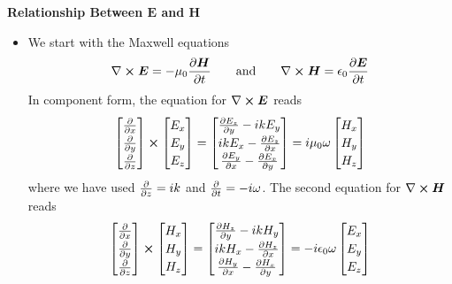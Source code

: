 \documentclass[11pt, a4paper]{article}
\newcommand{\eqtext}[1]{\qquad \text{#1} \qquad}
\renewcommand{\vec}[1]{\bm{#1}} %
\newcommand{\E}{\vec{E}}  %
\renewcommand{\H}{\vec{H}}  %
\newcommand{\ee}{\epsilon_{0}}  %
\newcommand{\mm}{\mu_{0}}  %
\newcommand{\m}{\vec{m}}  %
\renewcommand{\curl}{\nabla \cross}
\begin{document}
\textbf{Relationship Between $ \E $ and $ \H $}
\begin{itemize}
	\item We start with the Maxwell equations
	\begin{equation*}
		\curl \E = - \mm \pdv{\H}{t} \eqtext{and} \curl \H = \ee \pdv{\E}{t}
	\end{equation*}
	In component form, the equation for $ \curl \E $ reads
	\begin{equation*}
		\renewcommand*{\arraystretch}{1.2}
		\begin{bmatrix}
		\pdv{x}\\
		\pdv{y}\\
		\pdv{z}
		\end{bmatrix}
		\cross
		\begin{bmatrix}
		E_{x}\\
		E_{y}\\
		E_{z}
		\end{bmatrix}
		= 
		\begin{bmatrix} 
		\pdv{E_{z}}{y} - ik E_{y}\\
		ik E_{x} - \pdv{E_{z}}{x}\\
		\pdv{E_{y}}{x} - \pdv{E_{x}}{y}
		\end{bmatrix} 
		= i \mm \omega
		\begin{bmatrix}
		H_{x}\\
		H_{y}\\
		H_{z}
		\end{bmatrix}
	\end{equation*}
	where we have used $ \pdv{z} = ik $ and $ \pdv{t} = -i\omega $. The second equation for $ \curl \H $ reads
	\begin{equation*}\renewcommand*{\arraystretch}{1.2}
		\begin{bmatrix}
		\pdv{x}\\
		\pdv{y}\\
		\pdv{z}
		\end{bmatrix}
		\cross
		\begin{bmatrix}
		H_{x}\\
		H_{y}\\
		H_{z}
		\end{bmatrix}
		= 
		\begin{bmatrix}
		\pdv{H_{z}}{y} - ik H_{y}\\
		ik H_{x} - \pdv{H_{z}}{x}\\
		\pdv{H_{y}}{x} - \pdv{H_{x}}{y}
		\end{bmatrix} 
		= -i \ee \omega
		\begin{bmatrix}
		E_{x}\\
		E_{y}\\
		E_{z}
		\end{bmatrix}
	\end{equation*}
	

\end{itemize}
\end{document}
